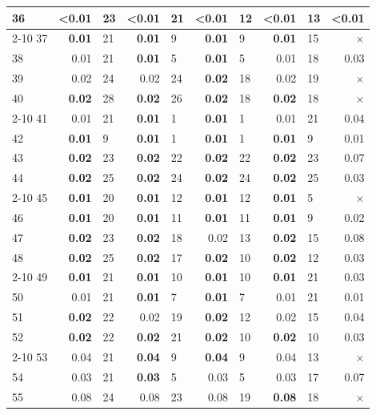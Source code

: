 \begin{longtable}{lr@{\hskip 4pt}l@{\hskip 12pt}r@{\hskip 4pt}l@{\hskip 12pt}r@{\hskip 4pt}l@{\hskip 12pt}r@{\hskip 4pt}l@{\hskip 12pt}r}
36 & \textbf{<0.01} & 23 & \textbf{<0.01} & 21 & \textbf{<0.01} & 12 & \textbf{<0.01} & 13 & \textbf{<0.01} \\
\cmidrule{2-10}
37 & \textbf{0.01} & 21 & \textbf{0.01} & 9 & \textbf{0.01} & 9 & \textbf{0.01} & 15 & $\times$ \\
38 & 0.01 & 21 & \textbf{0.01} & 5 & \textbf{0.01} & 5 & 0.01 & 18 & 0.03 \\
39 & 0.02 & 24 & 0.02 & 24 & \textbf{0.02} & 18 & 0.02 & 19 & $\times$ \\
40 & \textbf{0.02} & 28 & \textbf{0.02} & 26 & \textbf{0.02} & 18 & \textbf{0.02} & 18 & $\times$ \\
\cmidrule{2-10}
41 & 0.01 & 21 & \textbf{0.01} & 1 & \textbf{0.01} & 1 & 0.01 & 21 & 0.04 \\
42 & \textbf{0.01} & 9 & \textbf{0.01} & 1 & \textbf{0.01} & 1 & \textbf{0.01} & 9 & 0.01 \\
43 & \textbf{0.02} & 23 & \textbf{0.02} & 22 & \textbf{0.02} & 22 & \textbf{0.02} & 23 & 0.07 \\
44 & \textbf{0.02} & 25 & \textbf{0.02} & 24 & \textbf{0.02} & 24 & \textbf{0.02} & 25 & 0.03 \\
\cmidrule{2-10}
45 & \textbf{0.01} & 20 & \textbf{0.01} & 12 & \textbf{0.01} & 12 & \textbf{0.01} & 5 & $\times$ \\
46 & \textbf{0.01} & 20 & \textbf{0.01} & 11 & \textbf{0.01} & 11 & \textbf{0.01} & 9 & 0.02 \\
47 & \textbf{0.02} & 23 & \textbf{0.02} & 18 & 0.02 & 13 & \textbf{0.02} & 15 & 0.08 \\
48 & \textbf{0.02} & 25 & \textbf{0.02} & 17 & \textbf{0.02} & 10 & \textbf{0.02} & 12 & 0.03 \\
\cmidrule{2-10}
49 & \textbf{0.01} & 21 & \textbf{0.01} & 10 & \textbf{0.01} & 10 & \textbf{0.01} & 21 & 0.03 \\
50 & 0.01 & 21 & \textbf{0.01} & 7 & \textbf{0.01} & 7 & 0.01 & 21 & 0.01 \\
51 & \textbf{0.02} & 22 & 0.02 & 19 & \textbf{0.02} & 12 & 0.02 & 15 & 0.04 \\
52 & \textbf{0.02} & 22 & \textbf{0.02} & 21 & \textbf{0.02} & 10 & \textbf{0.02} & 10 & 0.03 \\
\cmidrule{2-10}
53 & 0.04 & 21 & \textbf{0.04} & 9 & \textbf{0.04} & 9 & 0.04 & 13 & $\times$ \\
54 & 0.03 & 21 & \textbf{0.03} & 5 & 0.03 & 5 & 0.03 & 17 & 0.07 \\
55 & 0.08 & 24 & 0.08 & 23 & 0.08 & 19 & \textbf{0.08} & 18 & $\times$ \\

\end{longtable}
